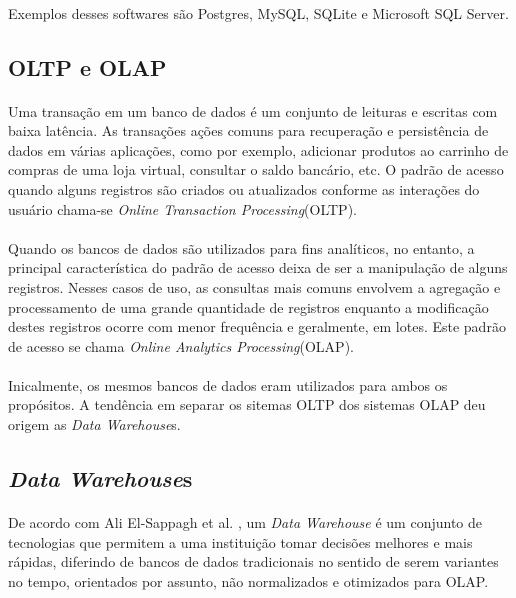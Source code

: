 \paragraph{} Exemplos desses softwares são Postgres, MySQL, SQLite e Microsoft SQL Server.

\subsection{OLTP e OLAP}

\paragraph{} Uma transação em um banco de dados é um conjunto de leituras e escritas com baixa latência. As transações ações comuns para recuperação e persistência de dados em várias aplicações, como por exemplo, adicionar produtos ao carrinho de compras de uma loja virtual, consultar o saldo bancário, etc. 
O padrão de acesso quando alguns registros são criados ou atualizados conforme as interações do usuário chama-se \textit{Online Transaction Processing}(OLTP).

\paragraph{} Quando os bancos de dados são utilizados para fins analíticos, no entanto, a principal característica do padrão de acesso deixa de ser a manipulação
de alguns registros. Nesses casos de uso, as consultas mais comuns envolvem a agregação e processamento de uma grande quantidade de registros enquanto a 
modificação destes registros ocorre com menor frequência e geralmente, em lotes. Este padrão de acesso se chama \textit{Online Analytics Processing}(OLAP).

\paragraph{} Inicalmente, os mesmos bancos de dados eram utilizados para ambos os propósitos. A tendência em separar os sitemas OLTP dos sistemas OLAP deu origem as \textit{Data Warehouse}s.\cite{kleppmann2017designing}

\subsection{\textit{Data Warehouse}s}

\paragraph{} De acordo com Ali El-Sappagh et al. \cite{el2011proposed}, um \textit{Data Warehouse} é um conjunto de tecnologias que permitem a uma instituição tomar decisões melhores e mais rápidas, diferindo de bancos de dados tradicionais no sentido de serem variantes no tempo, orientados por assunto, não normalizados e otimizados para OLAP.

